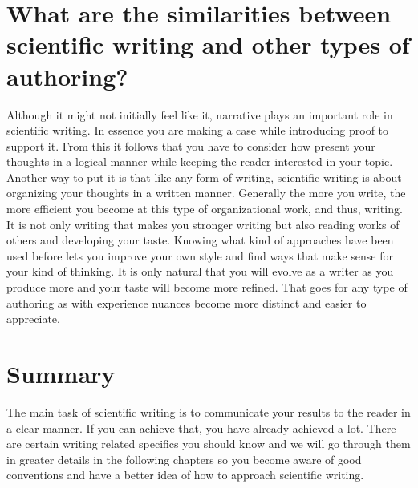 \section{What are the similarities between scientific writing and other types of authoring?}

Although it might not initially feel like it, narrative plays an important role in scientific writing.
In essence you are making a case while introducing proof to support it.
From this it follows that you have to consider how present your thoughts in a logical manner while keeping the reader interested in your topic.
Another way to put it is that like any form of writing, scientific writing is about organizing your thoughts in a written manner.
Generally the more you write, the more efficient you become at this type of organizational work, and thus, writing.
It is not only writing that makes you stronger writing but also reading works of others and developing your taste.
Knowing what kind of approaches have been used before lets you improve your own style and find ways that make sense for your kind of thinking.
It is only natural that you will evolve as a writer as you produce more and your taste will become more refined.
That goes for any type of authoring as with experience nuances become more distinct and easier to appreciate.

\section{Summary}

The main task of scientific writing is to communicate your results to the reader in a clear manner.
If you can achieve that, you have already achieved a lot.
There are certain writing related specifics you should know and we will go through them in greater details in the following chapters so you become aware of good conventions and have a better idea of how to approach scientific writing.
